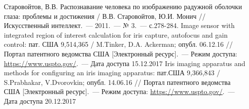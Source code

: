 \documentclass[10pt, a5paper]{article}
\begin{document}
\begin{thebibliography}{9}
 Старовойтов, В.В. Распознавание человека по изображению радужной оболочки глаза: проблемы и достижения / В.В. Старовойтов, Ю.И. Монич // Искусственный интеллект.~--- 2011.~--- № 3.~--- с.278-284.
 Image sensor with integrated region of interest calculation for iris capture, autofocus and gain control: пат. США 9,514,365 / M.Tinker, D.A. Ackerman; опубл. 06.12.16 // Портал патентного ведомства США [Электронный ресурс].~--- Режим доступа: \url{https://www.uspto.gov/}.~--- Дата доступа 15.12.2017
 Iris imaging apparatus and methods for configuring an iris imaging apparatus: пат.США 9,366,843 / S.Prabhakar, V.Dvorovkin; опубл. 14.06.16 // Портал патентного ведомства США [Электронный ресурс].~--- Режим доступа: \url{https://www.uspto.gov/}.~--- Дата доступа 20.12.2017
\end{thebibliography}
\end{document}

